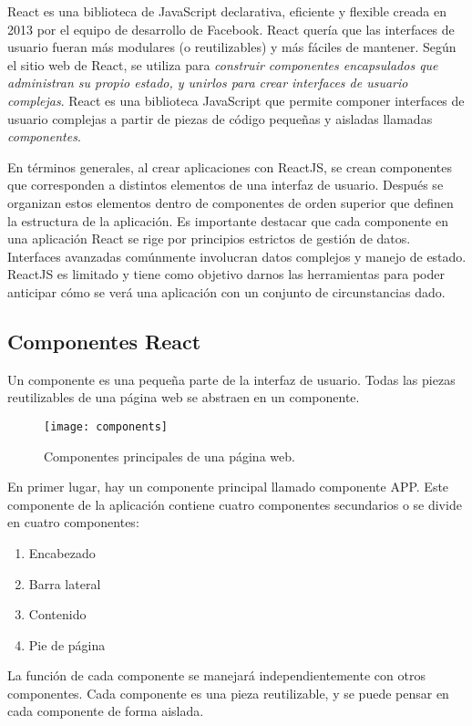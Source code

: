 React es una biblioteca de JavaScript declarativa, eficiente y flexible creada en 2013 por el equipo de desarrollo de Facebook. React quería que las interfaces de usuario fueran más modulares (o reutilizables) y más fáciles de mantener. Según el sitio web de React, se utiliza para \textit{construir componentes encapsulados que administran su propio estado, y unirlos para crear interfaces de usuario complejas}. React es una biblioteca JavaScript que permite componer interfaces de usuario complejas a partir de piezas de código pequeñas y aisladas llamadas \textit{componentes}.
\vspace{0.8cm}

En términos generales, al crear aplicaciones con ReactJS, se crean componentes que corresponden a distintos elementos de una interfaz de usuario. Después se organizan estos elementos dentro de componentes de orden superior que definen la estructura de la aplicación. Es importante destacar que cada componente en una aplicación React se rige por principios estrictos de gestión de datos. Interfaces avanzadas comúnmente involucran datos complejos y manejo de estado. ReactJS es limitado y tiene como objetivo darnos las herramientas para poder anticipar cómo se verá una aplicación con un conjunto de circunstancias dado.
\subsection{Componentes React}
Un componente es una pequeña parte de la interfaz de usuario. Todas las piezas reutilizables de una página web se abstraen en un componente.
\begin{figure}[H]
  \centering
  \texttt{[image: components]}
  \caption{Componentes principales de una página web.}
\end{figure}
En primer lugar, hay un componente principal llamado componente APP. Este componente de la aplicación contiene cuatro componentes secundarios o se divide en cuatro componentes:
\begin{enumerate}
  \item Encabezado
  \item Barra lateral
  \item Contenido
  \item Pie de página
\end{enumerate}
La función de cada componente se manejará independientemente con otros componentes. Cada componente es una pieza reutilizable, y se puede pensar en cada componente de forma aislada.
\vspace{0.8cm}

